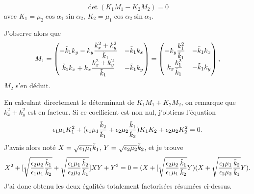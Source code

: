 \documentclass{amsart}
\begin{document}
\[
\operatorname{det}(K_1M_1-K_2M_2)=0
\]
avec \(K_1=\mu_2\cos \alpha_1\sin \alpha_2\), \(K_2=\mu_1\cos \alpha_2\sin \alpha_1\).

J'observe alors que
\[
M_1=
\begin{pmatrix}
-\tilde{k}_1k_y-k_y\dfrac{k_x^2+k_y^2}{\tilde{k}_1}  &   -\tilde{k}_1k_x
\\
\tilde{k}_1k_x+k_x\dfrac{k_x^2+k_y^2}{\tilde{k}_1}   &   -\tilde{k}_1k_y
\end{pmatrix}
=
\begin{pmatrix}
-k_y\dfrac{k_1^2}{\tilde{k}_1}   &   -\tilde{k}_1k_x
\\
k_x\dfrac{k_1^2}{\tilde{k}_1}    &   -\tilde{k}_1k_y
\end{pmatrix},
\]
\(M_2\) s'en déduit.

En calculant directement le déterminant de \(K_1M_1+K_2M_2\), on remarque que \(k_x^2+k_y^2\) est en facteur. Si ce coefficient est non nul, j'obtiens l'équation
\[
\epsilon_1\mu_1K_1^2+(\epsilon_1\mu_1\dfrac{\tilde{k}_2}{\tilde{k}_1}+\epsilon_2\mu_2\dfrac{\tilde{k}_1}{\tilde{k}_2})K_1K_2+\epsilon_2\mu_2K_2^2=0.
\]
J'avais alors noté \(X=\sqrt{\epsilon_1\mu_1}\tilde{k}_1\), \(Y=\sqrt{\epsilon_2\mu_2}\tilde{k}_2\), et je trouve
\[
X^2+[\sqrt{\dfrac{\epsilon_2\mu_2}{\epsilon_1\mu_1}\dfrac{\tilde{k}_1}{\tilde{k}_2}}+\sqrt{\dfrac{\epsilon_1\mu_1}{\epsilon_2\mu_2}\dfrac{\tilde{k}_2}{\tilde{k}_1}}]XY+Y^2
=
0
=
(X+[\sqrt{\dfrac{\epsilon_2\mu_2}{\epsilon_1\mu_1}\dfrac{\tilde{k}_1}{\tilde{k}_2}}Y)(X+\sqrt{\dfrac{\epsilon_1\mu_1}{\epsilon_2\mu_2}\dfrac{\tilde{k}_2}{\tilde{k}_1}}Y).
\]
J'ai donc obtenu les deux égalités totalement factorisées résumées ci-dessus.
\end{document}
